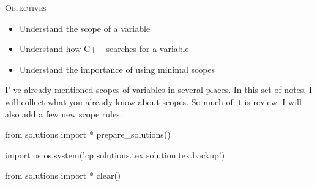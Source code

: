 
\textsc{Objectives}

\begin{itemize}
\item
  Understand the scope of a variable
\item
  Understand how C++ searches for a variable
\item
  Understand the importance of using minimal scopes
\end{itemize}

I' ve already mentioned scopes of variables in several
places. In this set of notes, I will collect what you already know about
scopes. So much of it is review. I will also add a few new scope rules.






\begin{python0}
from solutions import *
prepare_solutions()
\end{python0}
\begin{python}
import os
os.system('cp solutions.tex solution.tex.backup')  
\end{python}

\begin{python0}
from solutions import *
clear()
\end{python0}
